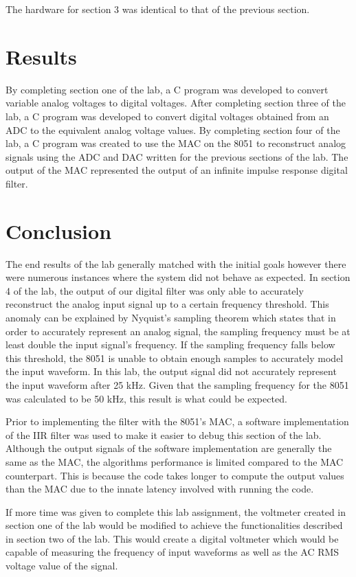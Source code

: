 \documentclass[12pt]{article}
\begin{document}
The hardware for section 3 was identical to that of the previous section. 

\section{Results}

By completing section one of the lab, a C program was developed to convert variable analog voltages to digital voltages. After completing section three of the lab, a C program was developed to convert digital voltages obtained from an ADC to the equivalent analog voltage values. By completing section four of the lab, a C program was created to use the MAC on the 8051 to reconstruct analog signals using the ADC and DAC written for the previous sections of the lab. The output of the MAC represented the output of an infinite impulse response digital filter.


\section{Conclusion}


The end results of the lab generally matched with the initial goals however there were numerous instances where the system did not behave as expected. In section 4 of the lab, the output of our digital filter was only able to accurately reconstruct the analog input signal up to a certain frequency threshold. This anomaly can be explained by Nyquist’s sampling theorem which states that in order to accurately represent an analog signal, the sampling frequency must be at least double the input signal’s frequency. If the sampling frequency falls below this threshold, the 8051 is unable to obtain enough samples to accurately model the input waveform. In this lab, the output signal did not accurately represent the input waveform after 25 kHz. Given that the sampling frequency for the 8051 was calculated to be 50 kHz, this result is what could be expected. 

Prior to implementing the filter with the 8051’s MAC, a software implementation of the IIR filter was used to make it easier to debug this section of the lab. Although the output signals of the software implementation are generally the same as the MAC, the algorithms performance is limited compared to the MAC counterpart. This is because the code takes longer to compute the output values than the MAC due to the innate latency involved with running the code. 

If more time was given to complete this lab assignment, the voltmeter created in section one of the lab would be modified to achieve the functionalities described in section two of the lab. This would create a digital voltmeter which would be capable of measuring the frequency of input waveforms as well as the AC RMS voltage value of the signal. 
\end{document}
